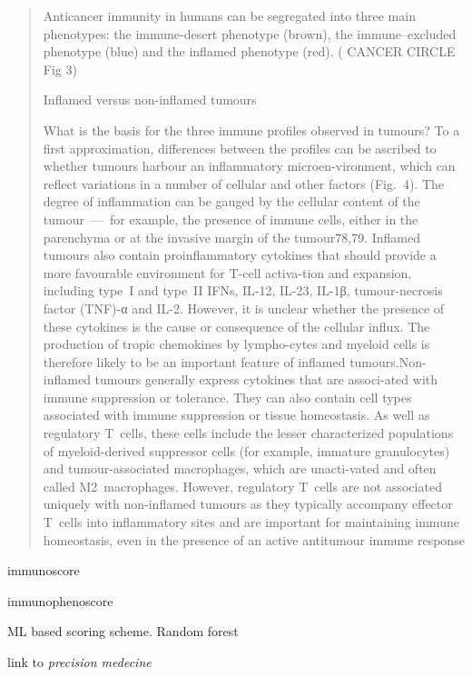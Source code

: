 \documentclass[12pt,]{book}
\theoremstyle{definition}
\theoremstyle{definition}
\theoremstyle{definition}
\theoremstyle{remark}
\begin{document}
\begin{quote}
Anticancer immunity in humans can be segregated into three main
phenotypes: the immune-desert phenotype (brown), the immune--excluded
phenotype (blue) and the inflamed phenotype (red). (\citet{IMMUNE}
CANCER CIRCLE Fig 3)

Inflamed versus non-inflamed tumours

What is the basis for the three immune profiles observed in tumours? To
a first approximation, differences between the profiles can be ascribed
to whether tumours harbour an inflammatory microen-vironment, which can
reflect variations in a number of cellular and other factors (Fig.~4).
The degree of inflammation can be gauged by the cellular content of the
tumour~---~for example, the presence of immune cells, either in the
parenchyma or at the invasive margin of the tumour78,79. Inflamed
tumours also contain proinflammatory cytokines that should provide a
more favourable environment for T-cell activa-tion and expansion,
including type~I and type~II IFNs, IL-12, IL-23, IL-1β, tumour-necrosis
factor (TNF)-α and IL-2. However, it is unclear whether the presence of
these cytokines is the cause or consequence of the cellular influx. The
production of tropic chemokines by lympho-cytes and myeloid cells is
therefore likely to be an important feature of inflamed
tumours.Non-inflamed tumours generally express cytokines that are
associ-ated with immune suppression or tolerance. They can also contain
cell types associated with immune suppression or tissue homeostasis. As
well as regulatory T~cells, these cells include the lesser characterized
populations of myeloid-derived suppressor cells (for example, immature
granulocytes) and tumour-associated macrophages, which are unacti-vated
and often called M2~macrophages. However, regulatory T~cells are not
associated uniquely with non-inflamed tumours as they typically
accompany effector T~cells into inflammatory sites and are important for
maintaining immune homeostasis, even in the presence of an active
antitumour immune response
\end{quote}

immunoscore

immunophenoscore

ML based scoring scheme. Random forest

link to \emph{precision medecine}
\end{document}
